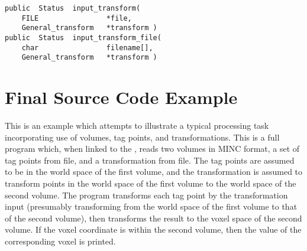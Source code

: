 
{\bf\begin{verbatim}
public  Status  input_transform(
    FILE                *file,
    General_transform   *transform )
public  Status  input_transform_file(
    char                filename[],
    General_transform   *transform )
\end{verbatim}}


\chapter{Final Source Code Example}

This is an example which attempts to illustrate a typical processing
task incorporating use of volumes, tag points, and transformations.
This is a full program which, when linked to the \vol,
reads two volumes in MINC format, a set of tag points from file, and a
transformation from file.  The tag points are assumed to be in the
world space of the first volume, and the transformation is assumed to
transform points in the world space of the first volume to the world
space of the second volume.  The program transforms each tag point by
the transformation input (presumably transforming from the world space
of the first volume to that of the second volume), then transforms the
result to the voxel space of the second volume.  If the
voxel coordinate is within the second volume, then the value of the
corresponding voxel is printed.

